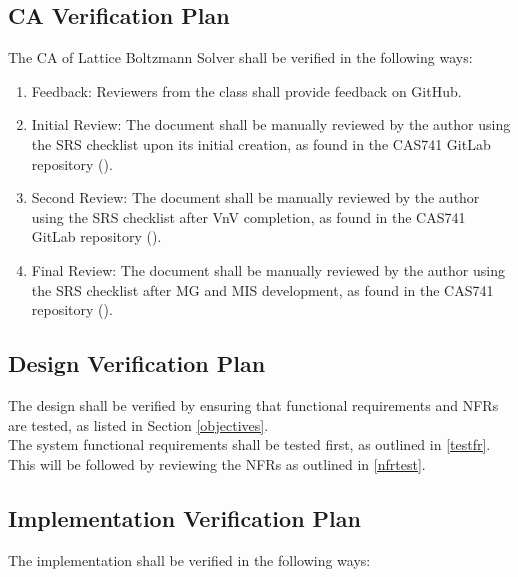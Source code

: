 \documentclass[12pt, titlepage]{article}
\newcommand{\famname}{Lattice Boltzmann Solver}
\begin{document}
\subsection{CA Verification Plan}

The CA of {\famname} shall be verified in the following ways:

\begin{enumerate}
\item Feedback: Reviewers from the class shall provide feedback on GitHub.
\item Initial Review: The document shall be manually reviewed by the author using the SRS checklist upon its initial creation, as found in the CAS741 GitLab repository (\citet{CAS741_SRS_checklist}).
\item Second Review: The document shall be manually reviewed by the author using the SRS checklist after VnV completion, as found in the CAS741 GitLab repository (\citet{CAS741_SRS_checklist}).
\item Final Review: The document shall be manually reviewed by the author using the SRS checklist after MG and MIS development, as found in the CAS741 repository (\citet{CAS741_SRS_checklist}).
\end{enumerate}

\subsection{Design Verification Plan}

The design shall be verified by ensuring that functional requirements and NFRs are tested, as listed in Section \ref{objectives}.\\

\noindent The system functional requirements shall be tested first, as outlined in \ref{testfr}. This will be followed by reviewing the NFRs as outlined in \ref{nfrtest}.


\subsection{Implementation Verification Plan}
  
\noindent The implementation shall be verified in the following ways:
\end{document}
